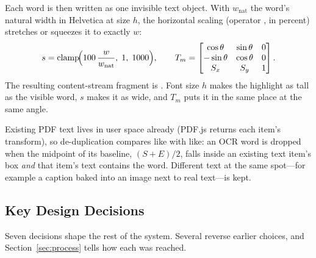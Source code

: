 Each word is then written as one invisible text object. With $w_{\text{nat}}$ the
word's natural width in Helvetica at size $h$, the horizontal scaling (operator
, in percent) stretches or squeezes it to exactly $w$:
\begin{equation}
  s = \operatorname{clamp}\!\Bigl(100\,\frac{w}{w_{\text{nat}}},\; 1,\; 1000\Bigr),
  \qquad
  T_m = \begin{bmatrix} \cos\theta & \sin\theta & 0\\ -\sin\theta & \cos\theta & 0\\ S_x & S_y & 1 \end{bmatrix}.
  \label{eq:tz}
\end{equation}
The resulting content-stream fragment is
. Font size $h$ makes the
highlight as tall as the visible word, $s$ makes it as wide, and $T_m$ puts it
in the same place at the same angle.

Existing PDF text lives in user space already (PDF.js returns each item's
transform), so de-duplication compares like with like: an OCR word is dropped
when the midpoint of its baseline, $(S+E)/2$, falls inside an existing text item's
box \emph{and} that item's text contains the word. Different text at the same
spot---for example a caption baked into an image next to real text---is kept.

\subsection{Key Design Decisions}
Seven decisions shape the rest of the system. Several reverse earlier choices,
and Section~\ref{sec:process} tells how each was reached.

